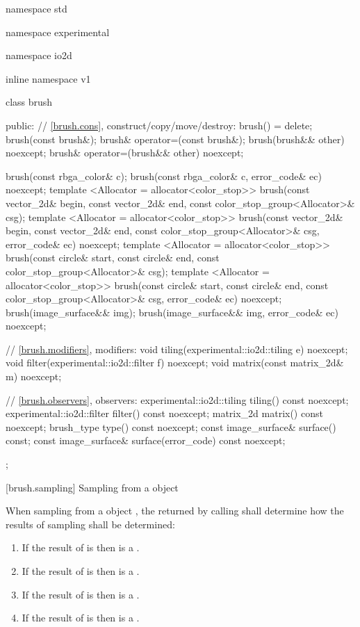 \begin{codeblock}
namespace std { namespace experimental { namespace io2d { inline namespace v1 {
  class brush {
  public:
    // \ref{brush.cons}, construct/copy/move/destroy:
    brush() = delete;
    brush(const brush&);
    brush& operator=(const brush&);
    brush(brush&& other) noexcept;
    brush& operator=(brush&& other) noexcept;
    
    brush(const rbga_color& c);
    brush(const rbga_color& c, error_code& ec) noexcept;
    template <Allocator = allocator<color_stop>>
    brush(const vector_2d& begin, const vector_2d& end,
      const color_stop_group<Allocator>& csg);
    template <Allocator = allocator<color_stop>>
    brush(const vector_2d& begin, const vector_2d& end,
      const color_stop_group<Allocator>& csg, error_code& ec) noexcept;
    template <Allocator = allocator<color_stop>>
    brush(const circle& start, const circle& end,
      const color_stop_group<Allocator>& csg);
    template <Allocator = allocator<color_stop>>
    brush(const circle& start, const circle& end,
      const color_stop_group<Allocator>& csg, error_code& ec) noexcept;
    brush(image_surface&& img);
    brush(image_surface&& img, error_code& ec) noexcept;

    // \ref{brush.modifiers}, modifiers:
    void tiling(experimental::io2d::tiling e) noexcept;
    void filter(experimental::io2d::filter f) noexcept;
    void matrix(const matrix_2d& m) noexcept;

    // \ref{brush.observers}, observers:
    experimental::io2d::tiling tiling() const noexcept;
    experimental::io2d::filter filter() const noexcept;
    matrix_2d matrix() const noexcept;
    brush_type type() const noexcept;
    const image_surface& surface() const;
    const image_surface& surface(error_code) const noexcept;
  };
} } } }
\end{codeblock}

 [brush.sampling] {Sampling from a  object}

\pnum
When sampling from a  object , the  returned by calling  shall determine how the results of sampling shall be determined:
\begin{enumerate}
\item If the result of  is  then  is a .
\item If the result of  is  then  is a .
\item If the result of  is  then  is a .
\item If the result of  is  then  is a .
\end{enumerate}

